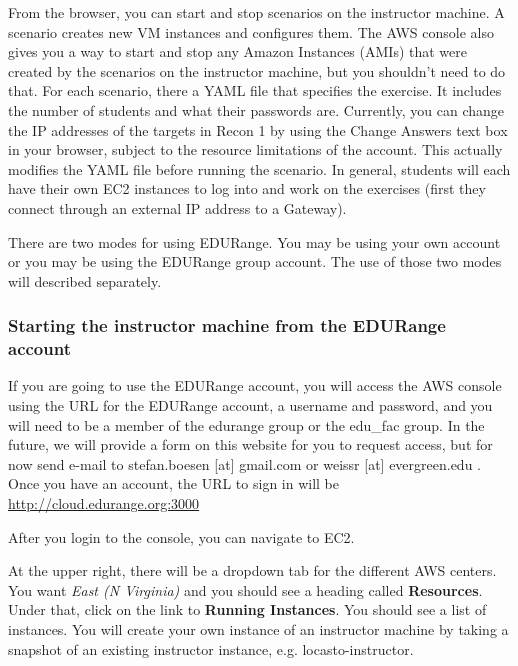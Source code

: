 \documentclass[11pt]{report}
\newcommand{\eat}[1]{}
\begin{document}
From the browser, you can  start and stop scenarios on the instructor machine.
A scenario creates new VM instances and configures them.
The AWS console also gives you a way
to start and stop any Amazon Instances (AMIs) that
were created by the scenarios on the instructor machine, but you shouldn't need to do that.
For each scenario, there a YAML file that specifies the exercise.
It includes the number of students and what their passwords are.  
Currently, you can change the IP addresses of the targets in Recon 1
by using the Change Answers text box in your browser, subject to the resource limitations 
of the account.  
This actually modifies the YAML file before running the scenario.
  In general, students will each have their 
own EC2 instances to log into and work on the exercises (first they connect through 
an external IP address to a Gateway). 
\eat{
The next section will lead you through 
starting an instructor machine and how to use it to create the scenarios.}
There are two modes for using EDURange.  You may be using your own account or you may
be using the EDURange group account.  The use of those two modes will described separately.

\subsubsection*{Starting the instructor machine from the EDURange account}
If you are going to use the EDURange account, you will access the AWS console
using the URL for the EDURange account,
a username and password, and you will need to 
be a member of the edurange group or the edu\_fac group. 
In the future, we will provide a form on this website for you to request access, but for now 
send e-mail to stefan.boesen [at] gmail.com or weissr [at] evergreen.edu .  Once you have an account,
the URL to sign in will be \url{http://cloud.edurange.org:3000}

   After you login to the console, you can navigate to EC2.  %
  \eat{Describe the role of VPCs and VPNs in AWS.  What are the limits.
we need a video of this.}
  At the upper right, there will be a dropdown tab
for the different AWS centers.  You want {\em  East (N Virginia)} and you should see a 
heading called {\bf Resources}.
Under that, click on the link to {\bf Running Instances}. You should see a list of instances.  You will
create your own instance of an instructor machine by taking a snapshot of an existing instructor instance,
 e.g. locasto-instructor.  
\end{document}
